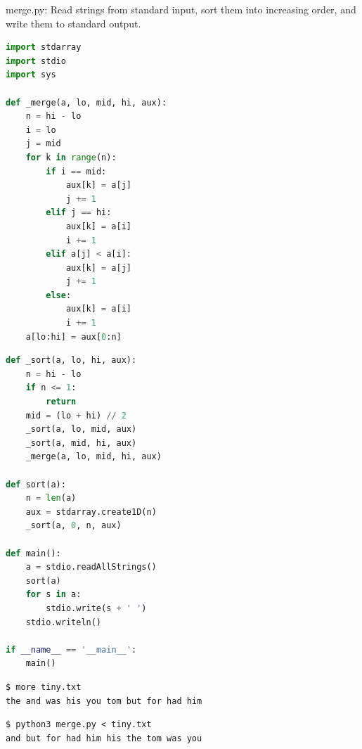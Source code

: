 \documentclass[8pt,a4paper,compress]{beamer}
\begin{document}
\begin{frame}[fragile]
\pause

\begin{framed}
\tiny merge.py: Read strings from standard input, sort them into increasing order, and write them to standard output.
\end{framed}

\begin{lstlisting}[language=python,style=focusin]
import stdarray
import stdio
import sys

def _merge(a, lo, mid, hi, aux):
    n = hi - lo
    i = lo
    j = mid
    for k in range(n):
        if i == mid:
            aux[k] = a[j]
            j += 1
        elif j == hi:
            aux[k] = a[i]
            i += 1
        elif a[j] < a[i]:
            aux[k] = a[j]
            j += 1
        else:
            aux[k] = a[i]
            i += 1
    a[lo:hi] = aux[0:n]
\end{lstlisting}
\end{frame}

\begin{frame}[fragile]
\pause

\begin{lstlisting}[language=python,style=focusin]
def _sort(a, lo, hi, aux):
    n = hi - lo
    if n <= 1:
        return
    mid = (lo + hi) // 2
    _sort(a, lo, mid, aux)
    _sort(a, mid, hi, aux)
    _merge(a, lo, mid, hi, aux)

def sort(a):
    n = len(a)
    aux = stdarray.create1D(n)
    _sort(a, 0, n, aux)

def main():
    a = stdio.readAllStrings()
    sort(a)
    for s in a:
        stdio.write(s + ' ')
    stdio.writeln()

if __name__ == '__main__':
    main()
\end{lstlisting}

\pause

\begin{lstlisting}[language={},style=focusin]
$ more tiny.txt 
the and was his you tom but for had him
\end{lstlisting}

\pause

\begin{lstlisting}[language={},style=focusin]
$ python3 merge.py < tiny.txt 
and but for had him his the tom was you 
\end{lstlisting}
\end{frame}
\end{document}
